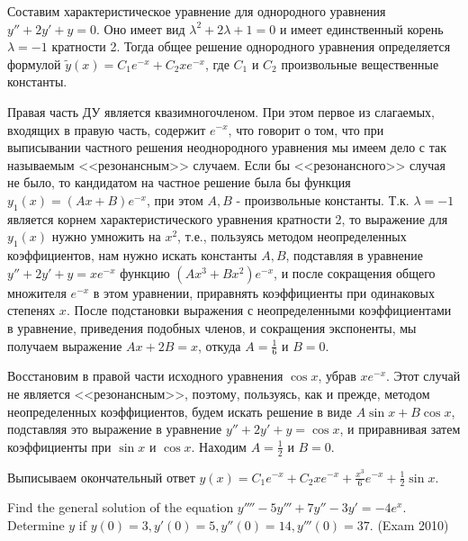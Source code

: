 \begin{solution}
Составим характеристическое уравнение для однородного уравнения $y''+2y'+y=0$. Оно имеет вид $\lambda ^{2} +2\lambda +1=0$ и имеет единственный корень $\lambda =-1$ кратности 2. Тогда общее решение однородного уравнения определяется формулой $\tilde{y}(x)=C_{1} e^{-x} +C_{2} xe^{-x} $, где $C_{1} $ и $C_{2} $ произвольные вещественные константы.

Правая часть ДУ является квазимногочленом. При этом первое из слагаемых, входящих в правую часть, содержит $e^{-x} $, что говорит о том, что при выписывании частного решения неоднородного уравнения мы имеем дело с так называемым <<резонансным>> случаем. Если бы <<резонансного>> случая не было, то кандидатом на частное решение была бы функция $y_{1} (x)=(Ax+B)e^{-x} $, при этом $A, B$ - произвольные константы. Т.к. $\lambda =-1$ является корнем характеристического уравнения кратности 2, то выражение для $y_{1} (x)$ нужно умножить на $x^{2} $, т.е., пользуясь методом неопределенных коэффициентов, нам нужно искать константы $A, B$, подставляя в уравнение $y''+2y'+y=xe^{-x} $ функцию $(Ax^{3} +Bx^{2} )e^{-x} $, и после сокращения общего множителя $e^{-x} $ в этом уравнении, приравнять коэффициенты при одинаковых степенях $x$. После подстановки выражения с неопределенными коэффициентами в уравнение, приведения подобных членов, и сокращения экспоненты, мы получаем выражение $Ax+2B=x$, откуда $A=\frac{1}{6} $ и $B=0$. 


Восстановим в правой части исходного уравнения $\cos x$, убрав $xe^{-x} $. Этот случай не является <<резонансным>>, поэтому, пользуясь, как и прежде, методом неопределенных коэффициентов, будем искать решение в виде $A\sin x+B\cos x$, подставляя это выражение в уравнение $y''+2y'+y=\cos x$, и приравнивая затем коэффициенты при $\sin x$ и $\cos x$. Находим $A=\frac{1}{2} $ и $B=0$.

Выписываем окончательный ответ $y(x)=C_{1} e^{-x} +C_{2} xe^{-x} +\frac{x^{3} }{6} e^{-x} +\frac{1}{2} \sin x$.
\end{solution}

\begin{problem}
Find the general solution of the equation $y''''-5y'''+7y''-3y'=-4e^{x} $. Determine $y$ if $y(0)=3, y'(0)=5, y''(0)=14, y'''(0)=37.$ (Exam 2010)
\end{problem}

